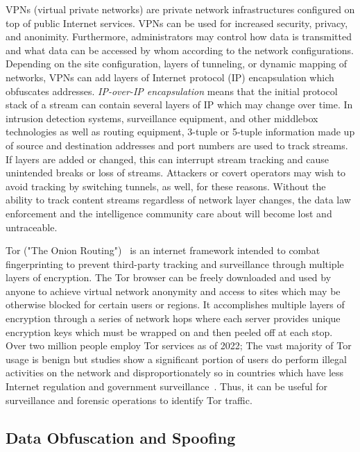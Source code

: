 VPNs (virtual private networks) are private network infrastructures configured on top of public Internet services. VPNs can be used for increased security, privacy, and anonimity. Furthermore, administrators may control how data is transmitted and what data can be accessed by whom according to the network configurations. Depending on the site configuration, layers of tunneling, or dynamic mapping of networks, VPNs can add layers of Internet protocol (IP) encapsulation which obfuscates addresses. \textit{IP-over-IP encapsulation} means that the initial protocol stack of a stream can contain several layers of IP which may change over time. In intrusion detection systems, surveillance equipment, and other middlebox technologies as well as routing equipment, 3-tuple or 5-tuple information made up of source and destination addresses and port numbers are used to track streams. If layers are added or changed, this can interrupt stream tracking and cause unintended breaks or loss of streams. Attackers or covert operators may wish to avoid tracking by switching tunnels, as well, for these reasons. Without the ability to track content streams regardless of network layer changes, the data law enforcement and the intelligence community care about will become lost and untraceable.

Tor ("The Onion Routing")~\cite{tor} is an internet framework intended to combat fingerprinting to prevent third-party tracking and surveillance through multiple layers of encryption. The Tor browser can be freely downloaded and used by anyone to achieve virtual network anonymity and access to sites which may be otherwise blocked for certain users or regions. It accomplishes multiple layers of encryption through a series of network hops where each server provides unique encryption keys which must be wrapped on and then peeled off at each stop. Over two million people employ Tor services as of 2022; The vast majority of Tor usage is benign but studies show a significant portion of users do perform illegal activities on the network and disproportionately so in countries which have less Internet regulation and government surveillance~\cite{Jardine2020ThePH}. Thus, it can be useful for surveillance and forensic operations to identify Tor traffic.

\subsection{Data Obfuscation and Spoofing}

